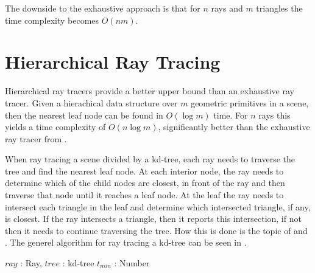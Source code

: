 The downside to the exhaustive approach is that for $n$ rays and $m$
triangles the time complexity becomes $O(nm)$.

\section{Hierarchical Ray Tracing}


Hierarchical ray tracers provide a better upper bound than an
exhaustive ray tracer. Given a hierachical data structure over $m$
geometric primitives in a scene, then the nearest leaf node can be
found in $O(\log m)$ time. For $n$ rays this yields a time complexity
of $O(n \log m)$, significantly better than the exhaustive ray tracer
from .


When ray tracing a scene divided by a kd-tree, each ray needs to
traverse the tree and find the nearest leaf node. At each interior
node, the ray needs to determine which of the child nodes are closest,
in front of the ray and then traverse that node until it reaches a
leaf node. At the leaf the ray needs to intersect each triangle in the
leaf and determine which intersected triangle, if any, is closest. If
the ray intersects a triangle, then it reports this intersection, if
not then it needs to continue traversing the tree. How this is done is
the topic of  and
. The generel algorithm for ray tracing a
kd-tree can be seen in .

\begin{algorithm}
  \caption{A generel kd-tree ray tracing algorithm}
  \label{alg:generelTracing}
  \begin{algorithmic}
              {$ray$ : Ray, $tree$ : kd-tree}
              {$t_{min}$ : Number}{
                  \ELSE
                  \ENDIF
                \ENDWHILE
              }
  \end{algorithmic}
\end{algorithm}

